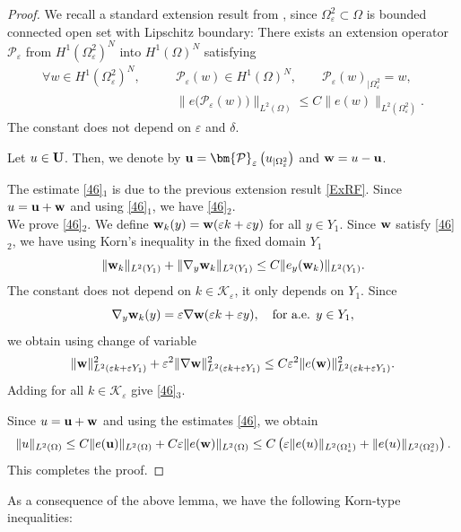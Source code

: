 \documentclass[11pt,a4paper]{article}
\numberwithin{equation}{section}
\def\O{\Omega}
\def\d{\delta}
\def\e{\varepsilon}
\def\Pc{{\mathcal{P}}}
\def\Kc{{\mathcal{K}}}
\def\Pc{{\mathcal{P}}}
\def\Gu{{\bf u}}
\def\Gw{{\bf w}}
\def\GU{{\bf U}}
\begin{document}
\begin{proof}
	We recall a standard extension result from \cite{Olenik,CDG}, since $\O^2_\e\subset \O$ is bounded connected open set with Lipschitz boundary: There exists an extension operator ${\bm\Pc}_\e$ from $H^1(\O^2_\e)^N$ into $H^1(\O)^N$ satisfying
	\begin{equation}
		\begin{aligned}
			\forall w\in H^1(\O^2_\e)^N,\qquad &{\bm\Pc}_\e(w)\in H^1(\O)^N,\qquad {\bm \Pc}_\e(w)_{|\O^2_\e}=w,\\
			&\big\|e\big({\bm\Pc}_\e(w)\big)\big\|_{L^2(\O)}\leq C\|e(w)\|_{L^2(\O^2_\e)}.
		\end{aligned}
	\end{equation}
	The constant does not depend on $\e$ and $\d$.
	
	Let $u\in \GU$. Then, we denote by $\Gu={\bm\Pc}_\e\left({u}_{|\O^2_\e}\right)$ and $\Gw=u-\Gu$.
	
	The estimate \eqref{46}$_1$ is due to the previous extension result \eqref{ExRF}. Since $u=\Gu+\Gw$ and using \eqref{46}$_1$, we have \eqref{46}$_2$.\\
	We prove \eqref{46}$_2$. We define $\Gw_k(y)=\Gw(\e k+ \e y)$ for all $y\in Y_1$. Since $\Gw$ satisfy \eqref{46}$_2$, we have using Korn's inequality in the fixed domain $Y_1$
	$$\|\Gw_k\|_{L^2(Y_1)}+\|\nabla_y \Gw_k\|_{L^2(Y_1)}\leq C\|e_y(\Gw_k)\|_{L^2(Y_1)}.$$
	The constant does not depend on $k\in \Kc_\e$, it only depends on $Y_1$.
	Since
	$$\nabla_y\Gw_k(y)=\e\nabla\Gw(\e k+ \e y),\quad\text{for a.e. $y\in Y_1$},$$
	we obtain using change of variable
	$$\|\Gw\|^2_{L^2(\e k+\e Y_1)}+ \e^2\|\nabla \Gw\|^2_{L^2(\e k+\e Y_1)}\leq C \e^2\|e(\Gw)\|^2_{L^2(\e k+\e Y_1)}.$$
	Adding for all $k\in\Kc_\e$ give \eqref{46}$_3$. 
	
	Since $ u=\Gu+\Gw$ and using the estimates \eqref{46}, we obtain
	$$\|u\|_{L^2(\O)}\leq C\|e(\Gu)\|_{L^2(\O)}+C\e\|e(\Gw)\|_{L^2(\O)}\leq C\left(\e\|e(u)\|_{L^2(\O^1_\e)}+\|e(u)\|_{L^2(\O^2_\e)}\right).$$
	This completes the proof.
\end{proof}
As a consequence of the above lemma, we have the following Korn-type inequalities:
\end{document}
